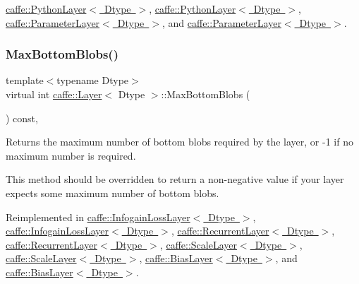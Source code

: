 \mbox{\hyperlink{classcaffe_1_1_python_layer_ae5baf7b7552ff0113c174b0e77db5f4c}{caffe\+::\+Python\+Layer$<$ Dtype $>$}}, \mbox{\hyperlink{classcaffe_1_1_python_layer_ae5baf7b7552ff0113c174b0e77db5f4c}{caffe\+::\+Python\+Layer$<$ Dtype $>$}}, \mbox{\hyperlink{classcaffe_1_1_parameter_layer_a1485ccdbd01513b89b29a79df7cda6ee}{caffe\+::\+Parameter\+Layer$<$ Dtype $>$}}, and \mbox{\hyperlink{classcaffe_1_1_parameter_layer_a1485ccdbd01513b89b29a79df7cda6ee}{caffe\+::\+Parameter\+Layer$<$ Dtype $>$}}.

\mbox{\label{classcaffe_1_1_layer_af8bdc989053e0363ab032026b46de7c3}} 
\subsubsection{\texorpdfstring{Max\+Bottom\+Blobs()}{MaxBottomBlobs()}\hspace{0.1cm}{\footnotesize\ttfamily [1/2]}}
{\footnotesize\ttfamily template$<$typename Dtype$>$ \\
virtual int \mbox{\hyperlink{classcaffe_1_1_layer}{caffe\+::\+Layer}}$<$ Dtype $>$\+::Max\+Bottom\+Blobs (\begin{DoxyParamCaption}{ }\end{DoxyParamCaption}) const\hspace{0.3cm}{\ttfamily [inline]}, {\ttfamily [virtual]}}



Returns the maximum number of bottom blobs required by the layer, or -\/1 if no maximum number is required. 

This method should be overridden to return a non-\/negative value if your layer expects some maximum number of bottom blobs. 

Reimplemented in \mbox{\hyperlink{classcaffe_1_1_infogain_loss_layer_a9b2372959a16da1e80ae7a98b7689a4c}{caffe\+::\+Infogain\+Loss\+Layer$<$ Dtype $>$}}, \mbox{\hyperlink{classcaffe_1_1_infogain_loss_layer_a9b2372959a16da1e80ae7a98b7689a4c}{caffe\+::\+Infogain\+Loss\+Layer$<$ Dtype $>$}}, \mbox{\hyperlink{classcaffe_1_1_recurrent_layer_a983e1ead91884f9d2049a3000254961c}{caffe\+::\+Recurrent\+Layer$<$ Dtype $>$}}, \mbox{\hyperlink{classcaffe_1_1_recurrent_layer_a983e1ead91884f9d2049a3000254961c}{caffe\+::\+Recurrent\+Layer$<$ Dtype $>$}}, \mbox{\hyperlink{classcaffe_1_1_scale_layer_a7867d035776f78fe486ce633ec0520ad}{caffe\+::\+Scale\+Layer$<$ Dtype $>$}}, \mbox{\hyperlink{classcaffe_1_1_scale_layer_a7867d035776f78fe486ce633ec0520ad}{caffe\+::\+Scale\+Layer$<$ Dtype $>$}}, \mbox{\hyperlink{classcaffe_1_1_bias_layer_abdb89e3bc940f999d1d4da83de90a97c}{caffe\+::\+Bias\+Layer$<$ Dtype $>$}}, and \mbox{\hyperlink{classcaffe_1_1_bias_layer_abdb89e3bc940f999d1d4da83de90a97c}{caffe\+::\+Bias\+Layer$<$ Dtype $>$}}.

